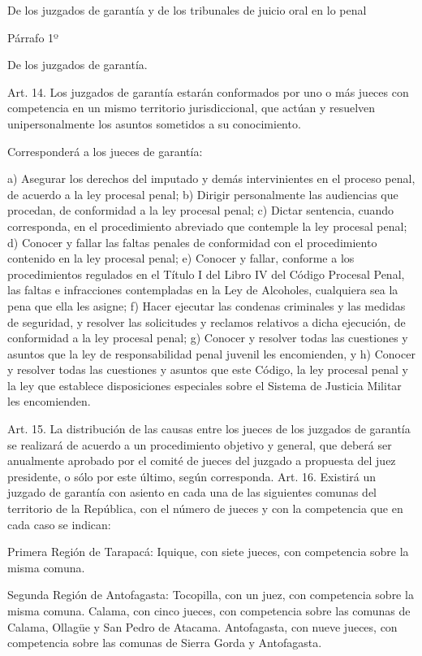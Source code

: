     De los juzgados de garantía y de los tribunales de juicio oral en lo penal



    Párrafo 1º

    De los juzgados de garantía.

    Art. 14. Los juzgados de garantía estarán conformados por uno o más jueces con competencia en un mismo territorio jurisdiccional, que actúan y resuelven unipersonalmente los asuntos sometidos a su conocimiento.

    Corresponderá a los jueces de garantía:

    a) Asegurar los derechos del imputado y demás intervinientes en el proceso penal, de acuerdo a la ley procesal penal;
    b) Dirigir personalmente las audiencias que procedan, de conformidad a la ley procesal penal;
    c) Dictar sentencia, cuando corresponda, en el procedimiento abreviado que contemple la ley procesal penal;
    d) Conocer y fallar las faltas penales de conformidad con el procedimiento contenido en la ley procesal penal;
    e) Conocer y fallar, conforme a los procedimientos regulados en el Título I del Libro IV del Código Procesal Penal, las faltas e infracciones contempladas en la Ley de Alcoholes, cualquiera sea la pena que ella les asigne;
    f) Hacer ejecutar las condenas criminales y las medidas de seguridad, y resolver las solicitudes y reclamos relativos a dicha ejecución, de conformidad a la ley procesal penal;
    g) Conocer y resolver todas las cuestiones y asuntos que la ley de responsabilidad penal juvenil les encomienden, y
    h) Conocer y resolver todas las cuestiones y asuntos que este Código, la ley procesal penal y la ley que establece disposiciones especiales sobre el Sistema de Justicia Militar les encomienden.


    Art. 15. La distribución de las causas entre los jueces de los juzgados de garantía se realizará de acuerdo a un procedimiento objetivo y general, que deberá ser anualmente aprobado por el comité de jueces del juzgado a propuesta del juez presidente, o sólo por este último, según corresponda.
    Art. 16. Existirá un juzgado de garantía con asiento en cada una de las siguientes comunas del territorio de la República, con el número de jueces y con la competencia que en cada caso se indican:

    Primera Región de Tarapacá:
    Iquique, con siete jueces, con competencia sobre la misma comuna.

    Segunda Región de Antofagasta:
    Tocopilla, con un juez, con competencia sobre la misma comuna.
    Calama, con cinco jueces, con competencia sobre las comunas de Calama, Ollagüe y San Pedro de Atacama.
    Antofagasta, con nueve jueces, con competencia sobre las comunas de Sierra Gorda y Antofagasta.

